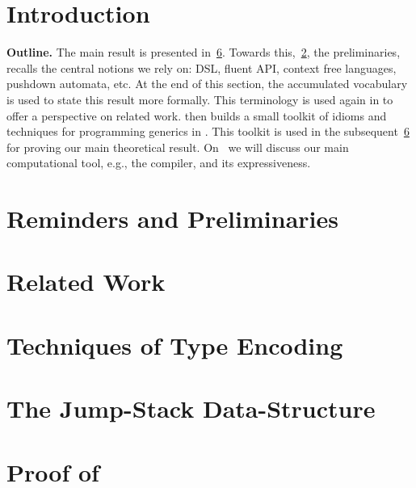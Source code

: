\documentclass[a4paper,USenglish]{lipics}
\author{Anonymized for the submission}
\begin{document}
\maketitle
\begin{abstract}
  
\end{abstract}

\section{Introduction}


\textbf{Outline.}
The main result is presented in~\cref{Section:proof}.
Towards this,~\cref{Section:preliminaries}, the preliminaries, 
  recalls the central notions we rely on: DSL, fluent API,
  context free languages, pushdown automata, etc. 
At the end of this section, the accumulated vocabulary is used to state this
  result more formally.
This terminology is used again in  to offer 
  a perspective on related work.
 then builds a small toolkit of idioms and techniques
  for programming generics in \Java.
This toolkit is used in the subsequent~\cref{Section:proof} for
  proving our main theoretical result.
On~ we will discuss our main computational tool, 
  e.g., the \Java compiler, and its expressiveness.

\section{Reminders and Preliminaries}
\label{Section:preliminaries}


\section{Related Work}
\label{Section:related}


\section{Techniques of Type Encoding}
\label{Section:toolkit}


\section{The Jump-Stack Data-Structure}
\label{Section:jump}


\section{Proof of }
\label{Section:proof}

\end{document}
